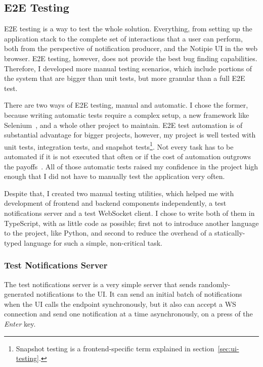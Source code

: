 \subsection{E2E Testing}\label{sec:e2e-testing}

E2E testing is a way to test the whole solution.
Everything,
from setting up the application stack
to the complete set of interactions
that a user can perform,
both from the perspective of notification producer,
and the Notipie UI in the web browser.
E2E testing, however, does not provide
the best bug finding capabilities.
Therefore,
I developed more manual testing scenarios,
which include portions of the system
that are bigger than unit tests,
but more granular than a full E2E test.

There are two ways of E2E testing,
manual and automatic.
I chose the former,
because writing automatic tests
require a complex setup,
a new framework like Selenium~\cite{steward_selenium_2022},
and a whole other project to maintain.
E2E test automation is of substantial advantage
for bigger projects, however,
my project is well tested with
unit tests,
integration tests, and
snapshot tests\footnote{
  Snapshot testing is a frontend-specific term
  explained in section~\ref{sec:ui-testing}.
}.
Not every task has to be automated
if it is not executed that often
or if the cost of automation outgrows
the payoffs~\cite{millett_patterns_2015}.
All of those automatic tests
raised my confidence in the project high enough
that I did not have to manually test
the application very often.

Despite that,
I created two manual testing utilities,
which helped me with development
of frontend and backend components independently,
a test notifications server
and a test WebSocket client.
I chose to write both of them in TypeScript,
with as little code as possible;
first not to introduce another language
to the project, like Python,
and second to reduce the overhead
of a statically-typed language
for such a simple, non-critical task.

\subsubsection{Test Notifications Server}\label{sec:test-notifications-server}

The test notifications server
is a very simple server that sends
randomly-generated notifications to the UI.
It can send an initial batch of notifications
when the UI calls the endpoint synchronously,
but it also can accept a WS connection
and send one notification at a time asynchronously,
on a press of the \textit{Enter} key.


